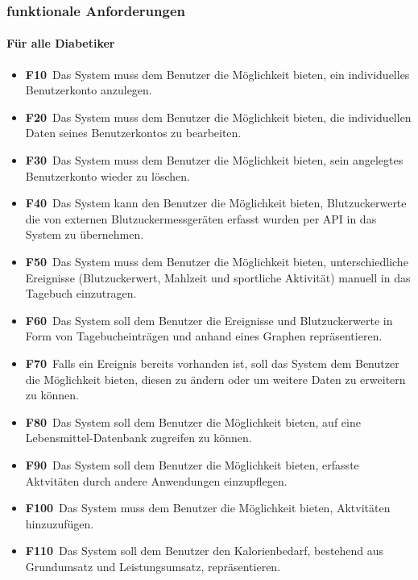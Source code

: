 \documentclass[a4paper,11pt]{article}%
\renewcommand{\\}{\vspace*{0.5\baselineskip} \newline}
\begin{document}
	\subsubsection{funktionale Anforderungen}
		\paragraph{Für alle Diabetiker}\mbox{}
	\begin{itemize}
		\item \lbrack \textbf{F10}\rbrack \ Das System muss dem Benutzer die Möglichkeit bieten, ein individuelles Benutzerkonto anzulegen.
		\item \lbrack \textbf{F20}\rbrack \  Das System muss dem Benutzer die Möglichkeit bieten, die individuellen Daten seines Benutzerkontos zu bearbeiten.
		\item \lbrack \textbf{F30}\rbrack \  Das System muss dem Benutzer die Möglichkeit bieten, sein angelegtes Benutzerkonto wieder zu löschen.
		\item \lbrack \textbf{F40}\rbrack \	Das System kann den Benutzer die Möglichkeit bieten, Blutzuckerwerte die von externen Blutzuckermessgeräten erfasst wurden per API in das System zu übernehmen.
		\item \lbrack \textbf{F50}\rbrack \	Das System muss dem Benutzer die Möglichkeit bieten, unterschiedliche Ereignisse (Blutzuckerwert, Mahlzeit und sportliche Aktivität) manuell in das Tagebuch einzutragen.
		\item \lbrack \textbf{F60}\rbrack \ Das System soll dem Benutzer die Ereignisse und Blutzuckerwerte in Form von Tagebucheinträgen und anhand eines Graphen repräsentieren.
		\item \lbrack \textbf{F70}\rbrack \ Falls ein Ereignis bereits vorhanden ist, soll das System dem Benutzer die Möglichkeit bieten, diesen zu ändern oder um weitere Daten zu erweitern zu können.
		\item \lbrack \textbf{F80}\rbrack \ Das System soll dem Benutzer die Möglichkeit bieten, auf eine Lebensmittel-Datenbank zugreifen zu können.
		\item \lbrack \textbf{F90}\rbrack \ Das System soll dem Benutzer die Möglichkeit bieten, erfasste Aktvitäten durch andere Anwendungen einzupflegen.
		\item \lbrack \textbf{F100}\rbrack \ Das System muss dem Benutzer die Möglichkeit bieten, Aktvitäten hinzuzufügen.
		\item \lbrack \textbf{F110}\rbrack \ Das System soll dem Benutzer den Kalorienbedarf, bestehend aus Grundumsatz und Leistungsumsatz, repräsentieren.

\end{itemize}
\end{document}
